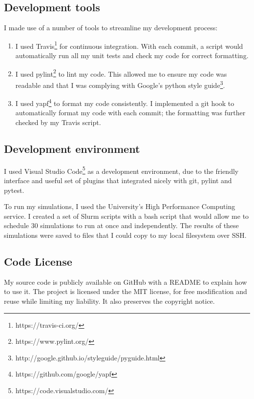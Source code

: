 \documentclass[12pt,a4paper,twoside,openright]{report}
\begin{document}
\subsection{Development tools}

I made use of a number of tools to streamline my development process:

\begin{enumerate}
	\item I used Travis\footnote{https://travis-ci.org/} for continuous integration. With each commit, a script would automatically run all my unit tests and check my code for correct formatting.
	\item I used pylint\footnote{https://www.pylint.org/} to lint my code. This allowed me to ensure my code was readable and that I was complying with Google's python style guide\footnote{http://google.github.io/styleguide/pyguide.html}.
	\item I used yapf\footnote{https://github.com/google/yapf} to format my code consistently. I implemented a git hook to automatically format my code with each commit; the formatting was further checked by my Travis script.
\end{enumerate}

\subsection{Development environment}

I used Visual Studio Code\footnote{https://code.visualstudio.com/} as a development environment, due to the friendly interface and useful set of plugins that integrated nicely with git, pylint and pytest. 

To run my simulations, I used the University's High Performance Computing service. I created a set of Slurm scripts with a bash script that would allow me to schedule 30 simulations to run at once and independently. The results of these simulations were saved to files that I could copy to my local filesystem over SSH.

\subsection{Code License}

My source code is publicly available on GitHub with a README to explain how to use it. The project is licensed under the MIT license, for free modification and reuse while limiting my liability. It also preserves the copyright notice.
\end{document}
